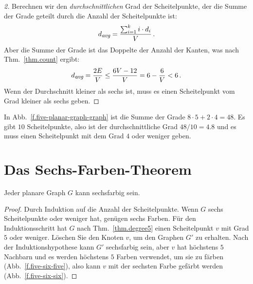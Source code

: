 \begin{proof}[2]
Berechnen wir den \emph{durchschnittlichen} Grad der Scheitelpunkte, der die Summe der Grade geteilt durch die Anzahl der Scheitelpunkte ist:
\[
d_{\textit{\footnotesize avg}}=\frac{\sum_{i=1}^{k} i\cdot d_i}{V}\,.
\]
Aber die Summe der Grade ist das Doppelte der Anzahl der Kanten, was nach Thm.~\ref{thm.count} ergibt:
\[
d_{\textit{\footnotesize avg}}=\frac{2E}{V}\leq \frac{6V-12}{V}=6-\frac{6}{V}<6\,.
\]
Wenn der Durchschnitt kleiner als sechs ist, muss es einen Scheitelpunkt vom Grad kleiner als sechs geben.
\end{proof}

\begin{example}
In Abb.~\ref{f.five-planar-graph-graph} ist die Summe der Grade $8\cdot 5 + 2\cdot 4=48$. Es gibt $10$ Scheitelpunkte, also ist der durchschnittliche Grad $48/10=4.8$ und es muss einen Scheitelpunkt mit dem Grad $4$ oder weniger geben.
\end{example}

\section{Das Sechs-Farben-Theorem}\label{s.six-color}

\begin{theorem}\label{thm.sixcolor}
Jeder planare Graph $G$ kann sechsfarbig sein.
\end{theorem}
\begin{proof}
Durch Induktion auf die Anzahl der Scheitelpunkte. Wenn $G$ sechs Scheitelpunkte oder weniger hat, genügen sechs Farben.
Für den Induktionsschritt hat $G$ nach Thm.~\ref{thm.degree5} einen Scheitelpunkt $v$ mit Grad $5$ oder weniger. Löschen Sie den Knoten $v$, um den Graphen $G'$ zu erhalten. Nach der Induktionshypothese kann $G'$ sechsfarbig sein, aber $v$ hat höchstens $5$ Nachbarn und es werden höchstens $5$ Farben verwendet, um sie zu färben (Abb.~\ref{f.five-six-five}), also kann $v$ mit der sechsten Farbe gefärbt werden (Abb.~\ref{f.five-six-six}).
\end{proof}

